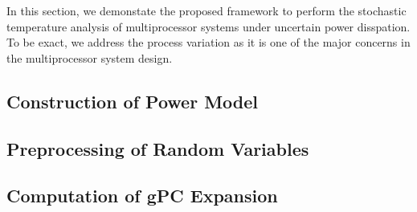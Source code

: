 In this section, we demonstate the proposed framework to perform the stochastic temperature analysis of multiprocessor systems under uncertain power disspation. To be exact, we address the process variation as it is one of the major concerns in the multiprocessor system design.

\subsection{Construction of Power Model}


\subsection{Preprocessing of Random Variables} 


\subsection{Computation of gPC Expansion} 


